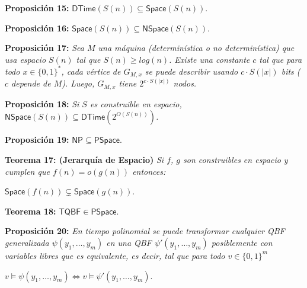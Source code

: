 \documentclass{article}
\begin{document}
\begin{flushleft}
  \textbf{Proposición 15:}
  $\mathsf{DTime}(S(n)) \subseteq \mathsf{Space}(S(n))$.
\end{flushleft}

\begin{flushleft}
  \textbf{Proposición 16:}
  $\mathsf{Space}(S(n)) \subseteq \mathsf{NSpace}(S(n))$.
\end{flushleft}

\begin{flushleft}
  \textbf{Proposición 17:}
  \textit{Sea $M$ una máquina (determinística o no determinística) que usa espacio $S(n)$ tal que
  $S(n) \geq log(n)$. Existe una constante $c$ tal que para todo $x \in \{ 0,1 \}^*$, cada vértice
  de $G_{M, x}$ se puede describir usando $c \cdot S(|x|)$ bits ($c$ depende de $M$). Luego, $G_{M,x}$
  tiene $2^{c \cdot S(|x|)}$ nodos.}
\end{flushleft}

\begin{flushleft}
  \textbf{Proposición 18:}
  \textit{Si $S$ es construible en espacio, $\mathsf{NSpace}(S(n)) \subseteq \mathsf{DTime}(2^{O(S(n))})$.}
\end{flushleft}

\begin{flushleft}
  \textbf{Proposición 19:}
  $\mathsf{NP} \subseteq \mathsf{PSpace}$.
\end{flushleft}

\begin{flushleft}
  \textbf{Teorema 17: \hypertarget{jerEspacio}{\textcolor{Bittersweet}{(Jerarquía de Espacio)}}}
  \textit{Si $f$, $g$ son construibles en espacio y cumplen que $f(n) = o(g(n))$ entonces:}
\end{flushleft}
\begin{center}
  $\mathsf{Space}(f(n)) \subsetneq \mathsf{Space}(g(n))$.
\end{center}

\begin{flushleft}
  \textbf{Teorema 18:}
  $\mathsf{TQBF} \in \mathsf{PSpace}$.
\end{flushleft}

\begin{flushleft}
  \textbf{Proposición 20:}
  \textit{En tiempo polinomial se puede transformar cualquier QBF generalizada $\psi (y_1, \dots, y_m)$ 
  en una QBF $\psi'(y_1, \dots, y_m)$ posiblemente con variables libres que es equivalente, es decir, tal 
  que para todo $v \in \{ 0,1 \}^m$}
\end{flushleft}
\begin{center}
  $v \models \psi(y_1, \dots, y_m) \iff v \models \psi'(y_1, \dots, y_m)$.
\end{center}
\end{document}
